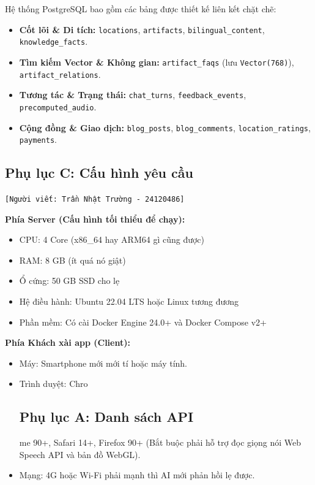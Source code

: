 Hệ thống PostgreSQL bao gồm các bảng được thiết kế liên kết chặt chẽ:
\begin{itemize}
    \item \textbf{Cốt lõi \& Di tích:} \texttt{locations}, \texttt{artifacts}, \texttt{bilingual\_content}, \texttt{knowledge\_facts}.
    \item \textbf{Tìm kiếm Vector \& Không gian:} \texttt{artifact\_faqs} (lưu \texttt{Vector(768)}), \texttt{artifact\_relations}.
    \item \textbf{Tương tác \& Trạng thái:} \texttt{chat\_turns}, \texttt{feedback\_events}, \texttt{precomputed\_audio}.
    \item \textbf{Cộng đồng \& Giao dịch:} \texttt{blog\_posts}, \texttt{blog\_comments}, \texttt{location\_ratings}, \texttt{payments}.
\end{itemize}

\subsection{Phụ lục C: Cấu hình yêu cầu}
\texttt{[Người viết: Trần Nhật Trường - 24120486]}

\textbf{Phía Server (Cấu hình tối thiểu để chạy):}
\begin{itemize}
    \item CPU: 4 Core (x86\_64 hay ARM64 gì cũng được)
    \item RAM: 8 GB (ít quá nó giật)
    \item Ổ cứng: 50 GB SSD cho lẹ
    \item Hệ điều hành: Ubuntu 22.04 LTS hoặc Linux tương đương
    \item Phần mềm: Có cài Docker Engine 24.0+ và Docker Compose v2+
\end{itemize}
\textbf{Phía Khách xài app (Client):}
\begin{itemize}
    \item Máy: Smartphone mới mới tí hoặc máy tính.
    \item Trình duyệt: Chro\subsection{Phụ lục A: Danh sách API}me 90+, Safari 14+, Firefox 90+ (Bắt buộc phải hỗ trợ đọc giọng nói Web Speech API và bản đồ WebGL).
    \item Mạng: 4G hoặc Wi-Fi phải mạnh thì AI mới phản hồi lẹ được.
\end{itemize}
